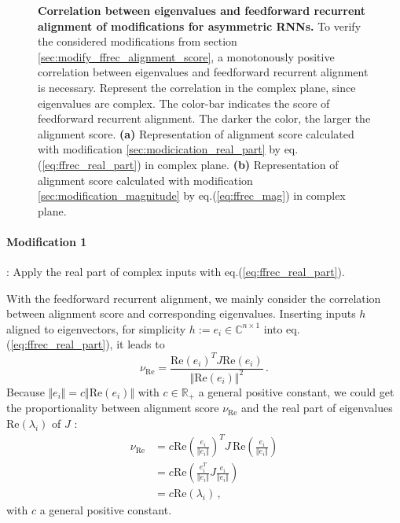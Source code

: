 \documentclass[11pt]{article}
\begin{document}
\begin{figure}[H]
			\caption{\textbf{Correlation between eigenvalues and feedforward recurrent alignment of modifications for asymmetric RNNs.} To verify the considered modifications from section \ref{sec:modify_ffrec_alignment_score}, a monotonously positive correlation between eigenvalues and feedforward recurrent alignment is necessary. Represent the correlation in the complex plane, since eigenvalues are complex. The color-bar indicates the score of feedforward recurrent alignment. The darker the color, the larger the alignment score.  \textbf{(a)} Representation of alignment score calculated with modification \ref{sec:modicication_real_part} by eq.(\ref{eq:ffrec_real_part}) in complex plane. \textbf{(b)} Representation of alignment score calculated with modification \ref{sec:modification_magnitude} by eq.(\ref{eq:ffrec_mag}) in complex plane.}
		\end{figure}
	
	\vspace{0.5cm}
	\paragraph{Modification 1}: Apply the real part of complex inputs with eq.(\ref{eq:ffrec_real_part}).
	
	With the feedforward recurrent alignment, we mainly consider the correlation between alignment score and corresponding eigenvalues. Inserting inputs $h$ aligned to eigenvectors, for simplicity $h := e_i \in \mathbb{C}^{n \times 1}$ into eq.(\ref{eq:ffrec_real_part}), it leads to
		\begin{equation}
			\nu_{\text{Re}} = \frac{\text{Re}(e_i)^T J \text{Re}(e_i)}{\Vert \text{Re}(e_i)\Vert^2} \, .
		\end{equation}
	Because $\Vert e_i \Vert = c \Vert \text{Re}(e_i) \Vert$ with $c \in \mathbb{R_{+}}$ a general positive constant, we could get the proportionality between alignment score $\nu_{\text{Re}}$ and the real part of eigenvalues $\text{Re}(\lambda_i)$ of $J$ :
		\begin{equation}
			\begin{split}
				\nu_{\text{Re}} & = c \text{Re}\left( \frac{e_i}{\Vert e_i \Vert} \right)^T J \, \text{Re}\left( \frac{e_i}{\Vert e_i \Vert} \right) \\
				& = c \text{Re} \left( \frac{e_i^T}{\Vert e_i \Vert} J \frac{e_i}{\Vert e_i \Vert} \right) \\
				& = c \text{Re}(\lambda_i) \, ,
			\end{split}
		\end{equation}
	with $c$ a general positive constant.
	
\end{document}
